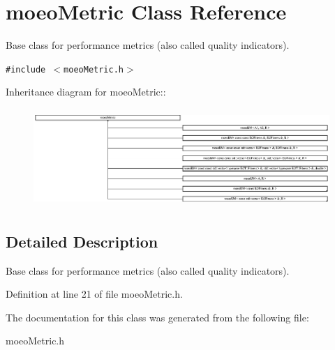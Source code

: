 \section{moeo\-Metric Class Reference}
\label{classmoeoMetric}
Base class for performance metrics (also called quality indicators).  


{\tt \#include $<$moeo\-Metric.h$>$}

Inheritance diagram for moeo\-Metric::\begin{figure}[H]
\begin{center}
\leavevmode
\includegraphics[height=3.75559cm]{classmoeoMetric}
\end{center}
\end{figure}


\subsection{Detailed Description}
Base class for performance metrics (also called quality indicators). 



Definition at line 21 of file moeo\-Metric.h.

The documentation for this class was generated from the following file:\begin{CompactItemize}
\item 
moeo\-Metric.h\end{CompactItemize}
